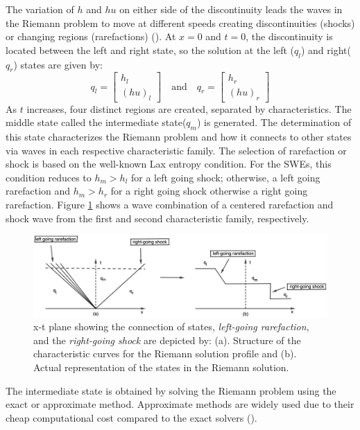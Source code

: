\documentclass[10pt,a4paper]{article}
\begin{document}
	The variation of $h$ and $hu$ on either side of the discontinuity leads the waves in the Riemann problem to move at different speeds creating discontinuities (shocks) or changing regions (rarefactions) (\cite{leveque2002finite}).  At $x = 0$ and $t = 0$,   the discontinuity is located between the left and right state, so the solution at the left ($q_{l}$) and right($q_{r}$) states are given by: 
	\begin{equation}
		q_{l} = \begin{bmatrix}
			h_{l} \\( hu)_{l}
		\end{bmatrix}  \quad \text{and} \quad q_{r} = \begin{bmatrix}
			h_{r} \\( hu)_{r}
		\end{bmatrix} 
		\label{ic}
	\end{equation}
	As $t$ increases, four distinct regions are created, separated by characteristics. The middle state called the intermediate state($q_{m}$) is generated.  The determination of this state characterizes the Riemann problem and how it connects to other states via waves in each respective characteristic family.  The selection of rarefaction or shock is based on the well-known Lax entropy condition.   For the SWEs, this condition reduces to $h_m > h_l$ for a left going shock; otherwise, a left going rarefaction and $h_m>h_r$ for a right going shock otherwise a right going rarefaction.    Figure \ref{fig:x-tplane} shows a wave combination of a centered rarefaction and shock wave from the first and second characteristic family, respectively.
	
	\begin{figure}[H]
		\centering
		\includegraphics[width=.77\linewidth]{images/geo11}
		\caption{ x-t plane showing the connection of states, {\em left-going rarefaction}, and the {\em right-going shock} are depicted by: (a). Structure of the characteristic curves for the  Riemann solution profile and (b). Actual representation of the states in the Riemann solution.}
		\label{fig:x-tplane}
	\end{figure}
	The intermediate state is obtained by solving the Riemann problem using the exact or approximate method. Approximate methods are widely used due to their cheap computational cost compared to the exact solvers (\cite{roe1981approximate}).
	
\end{document}
